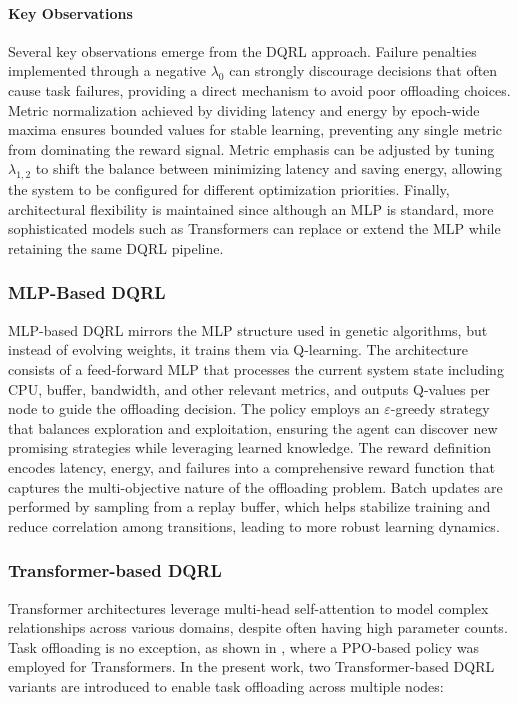 \documentclass[preprint,12pt]{elsarticle}
\begin{document}
\paragraph{Key Observations}
Several key observations emerge from the DQRL approach. Failure penalties implemented through a negative \(\lambda_{0}\) can strongly discourage decisions that often cause task failures, providing a direct mechanism to avoid poor offloading choices. Metric normalization achieved by dividing latency and energy by epoch-wide maxima ensures bounded values for stable learning, preventing any single metric from dominating the reward signal. Metric emphasis can be adjusted by tuning \(\lambda_{1,2}\) to shift the balance between minimizing latency and saving energy, allowing the system to be configured for different optimization priorities. Finally, architectural flexibility is maintained since although an MLP is standard, more sophisticated models such as Transformers can replace or extend the MLP while retaining the same DQRL pipeline.

\subsubsection{MLP-Based DQRL}
\label{subsubsec:mlp_dqrl}
MLP-based DQRL mirrors the MLP structure used in genetic algorithms, but instead of evolving weights, it trains them via Q-learning. The architecture consists of a feed-forward MLP that processes the current system state including CPU, buffer, bandwidth, and other relevant metrics, and outputs Q-values per node to guide the offloading decision. The policy employs an \(\varepsilon\)-greedy strategy that balances exploration and exploitation, ensuring the agent can discover new promising strategies while leveraging learned knowledge. The reward definition encodes latency, energy, and failures into a comprehensive reward function that captures the multi-objective nature of the offloading problem. Batch updates are performed by sampling from a replay buffer, which helps stabilize training and reduce correlation among transitions, leading to more robust learning dynamics.


\subsubsection{Transformer-based DQRL}
\label{subsubsec:transformers}

Transformer architectures \cite{vaswani2023attentionneed} leverage multi-head self-attention to model complex relationships across various domains, despite often having high parameter counts. Task offloading is no exception, as shown in \cite{gholipour_tpto_2023}, where a PPO-based policy was employed for Transformers. In the present work, two Transformer-based DQRL variants are introduced to enable task offloading across multiple nodes:
\end{document}
